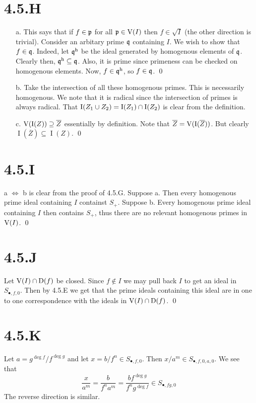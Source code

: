 \documentclass{article}
\begin{document}
\section{4.5.H}
\begin{itemize}
    \item[a.] This says that if $f \in \mathfrak{p}$ for all $\mathfrak{p} \in \operatorname{V}(I)$
          then $f \in \sqrt{I}$ (the other direction is trivial). Consider an
          arbitary prime $\mathfrak{q}$ containing $I$. We
          wish to show that $f \in \mathfrak{q}$. Indeed, let $\mathfrak{q}^{\text{h}}$
          be the ideal generated by homogenous elements of $\mathfrak{q}$.
          Clearly then, $\mathfrak{q}^{\text{h}} \subseteq \mathfrak{q}$. Also, it is prime since primeness can be
          checked on homogenous elements. Now, $f \in \mathfrak{q}^{\text{h}}$, so
          $f \in \mathfrak{q}$. \qed
    \item[b.] Take the intersection of all these homogenous primes. This is necessarily
          homogenous. We note that it is radical since the intersection of primes is
          always radical. That $\operatorname{I}(Z_1 \cup Z_2) = \operatorname{I}(Z_1) \cap
              \operatorname{I}(Z_2)$ is clear from the definition.
    \item[c.] $\operatorname{V}(\operatorname{I}(Z)) \supseteq \overline{Z}$ essentially by definition. Note that
          $\overline{Z}=\operatorname{V}(\operatorname{I}(\overline{Z}))$. But clearly $\operatorname{I}(\overline{Z}) \subseteq \operatorname{I}(Z)$. \qed
\end{itemize}

\section{4.5.I}
a $\iff$ b is clear from the proof of 4.5.G. Suppose a. Then
every homogenous prime ideal containing $I$ containst
$S_+$. Suppose b. Every homogenous prime ideal containing
$I$ then contains $S_+$, thus there are
no relevant homogenous primes in $\operatorname{V}(I)$. \qed

\section{4.5.J}
Let $\operatorname{V}(I) \cap \operatorname{D}(f)$ be closed. Since $f \notin I$ we may
pull back $I$ to get an ideal in $S_{\bullet, f, 0}$.
Then by 4.5.E we get that the prime ideals containing this ideal are in one to
one correspondence with the ideals in $\operatorname{V}(I) \cap \operatorname{D}(f)$. \qed

\section{4.5.K}
Let $a=g^{\deg f}/f^{\deg g}$ and let $x = b/f^n \in S_{\bullet, f, 0}$. Then
$x/a^m \in S_{\bullet, f, 0, a, 0}$. We see that \[
    \frac{x}{a^m} = \frac{b}{f^na^m} =
    \frac{bf^{\deg g}}{f^ng^{\deg f}} \in
    S_{\bullet, fg, 0}
\] The reverse
direction is similar.
\end{document}
